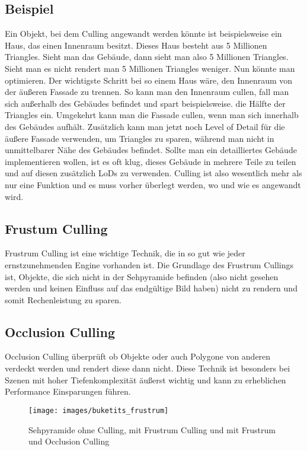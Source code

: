 \subsection{Beispiel}
Ein Objekt, bei dem Culling angewandt werden könnte ist beispielsweise ein Haus, das einen Innenraum besitzt. Dieses Haus besteht aus 5 Millionen Triangles. Sieht man das Gebäude, dann sieht man also 5 Millionen Triangles. Sieht man es nicht rendert man 5 Millionen Triangles weniger. Nun könnte man optimieren.
Der wichtigste Schritt bei so einem Haus wäre, den Innenraum von der äußeren Fassade zu trennen. So kann man den Innenraum cullen, fall man sich außerhalb des Gebäudes befindet und spart beispielsweise. die Hälfte der Triangles ein. Umgekehrt kann man die Fassade cullen, wenn man sich innerhalb des Gebäudes aufhält.
Zusätzlich kann man jetzt noch Level of Detail für die äußere Fassade verwenden, um Triangles zu sparen, während man nicht in unmittelbarer Nähe des Gebäudes befindet. Sollte man ein detailliertes Gebäude implementieren wollen, ist es oft klug, dieses Gebäude in mehrere Teile zu teilen und auf diesen zusätzlich LoDs zu verwenden. Culling ist also wesentlich mehr als nur eine Funktion und es muss vorher überlegt werden, wo und wie es angewandt wird.

\cite{_cryengine_culling}

\subsection{Frustum Culling}
Frustrum Culling ist eine wichtige Technik, die in so gut wie jeder ernstzunehmenden Engine vorhanden ist. Die Grundlage des Frustrum Cullings ist, Objekte, die sich nicht in der Sehpyramide befinden (also nicht gesehen werden und keinen Einfluss auf das endgültige Bild haben) nicht zu rendern und somit Rechenleistung zu sparen.
\cite{_cryengine_culling}

\subsection{Occlusion Culling}
Occlusion Culling überprüft ob Objekte oder auch Polygone von anderen verdeckt werden und rendert diese dann nicht. Diese Technik ist besonders bei Szenen mit hoher Tiefenkomplexität äußerst wichtig und kann zu erheblichen Performance Einsparungen führen.
\cite{_cryengine_culling}

\begin{figure}[H]
	\centering
	\texttt{[image: images/buketits\_frustrum]}
	\caption{Sehpyramide ohne Culling, mit Frustrum Culling und mit Frustrum und Occlusion Culling\cite{_culling}}
\end{figure}

